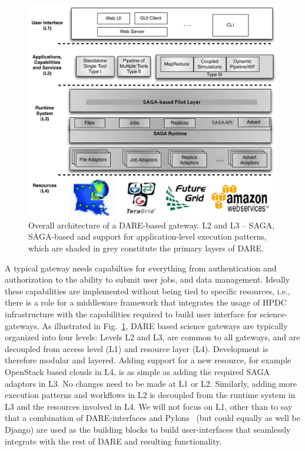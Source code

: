 \documentclass[]{svjour3}
\begin{document}
\begin{figure}
 \centering
 \includegraphics[scale=0.55]{figures/dare-middleware-arch.pdf}
 \caption{\small Overall architecture of a DARE-based gateway. L2 and
   L3 -- SAGA, SAGA-based \pilotjobs and support for application-level
   execution patterns, which are shaded in grey constitute the primary
   layers of DARE.}
 \label{fig:dare-arch}
\end{figure}


A typical gateway needs capabilties for everything from authentication
and authorization to the ability to submit user jobs, and data
management.  Ideally these capabilities are implemented without being
tied to specific resources, i.e., there is a role for a middleware
framework that integrates the usage of HPDC infrastructure with the
capabilities required to build user interface for science-gateways.
As illustrated in Fig.~\ref{fig:dare-arch}, DARE based science
gateways are typically organized into four levels: Levels L2 and L3,
are common to all gateways, and are decoupled from access level (L1)
and resource layer (L4). Development is therefore modular and
layered. Adding support for a new resource, for example OpenStack
based clouds in L4, is as simple as adding the required SAGA adaptors
in L3. No changes need to be made at L1 or L2. Similarly, adding more
execution patterns and workflows in L2 is decoupled from the runtime
system in L3 and the resources involved in L4.  We will not focus on
L1, other than to say that a combination of DARE-interfaces and
Pylons~\cite{pylons_website} (but could equally as well be Django) are
used as the building blocks to build user-interfaces that seamlessly
integrate with the rest of DARE and resulting functionality.
\end{document}
